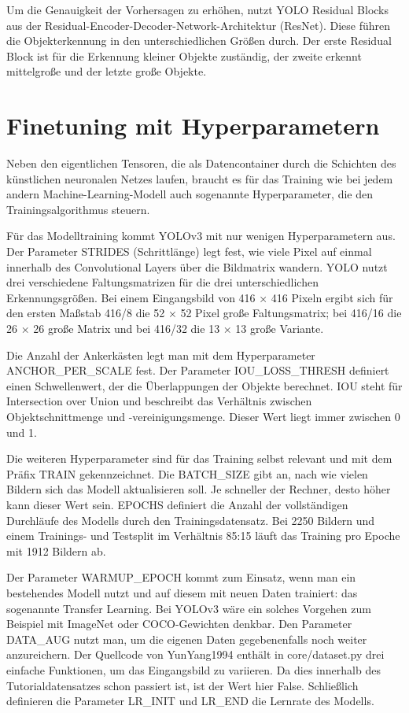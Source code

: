 	Um die Genauigkeit der Vorhersagen zu erhöhen, nutzt YOLO Residual Blocks aus der Residual-Encoder-Decoder-Network-Architektur (ResNet). Diese führen die Objekterkennung in den unterschiedlichen Größen durch. Der erste Residual Block ist für die Erkennung kleiner Objekte zuständig, der zweite erkennt mittelgroße und der letzte große Objekte.  

\section{Finetuning mit Hyperparametern}

Neben den eigentlichen Tensoren, die als Datencontainer durch die Schichten des künstlichen neuronalen Netzes laufen, braucht es für das Training wie bei jedem andern Machine-Learning-Modell auch sogenannte Hyperparameter, die den Trainingsalgorithmus steuern. 

Für das Modelltraining kommt ­YOLOv3 mit nur wenigen Hyperparametern aus. Der Parameter STRIDES (Schrittlänge) legt fest, wie viele Pixel auf einmal innerhalb des Convolutional Layers über die Bildmatrix wandern. YOLO nutzt drei verschiedene Faltungsmatrizen für die drei unterschiedlichen Erkennungsgrößen. Bei einem Eingangsbild von 416 × ­416 Pixeln ergibt sich für den ersten Maßstab 416/8 die 52 × 52 Pixel große Faltungsmatrix; bei 416/16 die 26 × 26 große Matrix und bei 416/32 die 13 × 13 große Variante. 

Die Anzahl der Ankerkästen legt man mit dem Hyperparameter ANCHOR\_PER\_SCALE fest. Der Parameter IOU\_LOSS\_THRESH definiert einen Schwellenwert, der die Überlappungen der Ob­jekte berechnet. IOU steht für Intersection over Union und beschreibt das Verhältnis zwischen Objektschnittmenge und -vereinigungsmenge. Dieser Wert liegt immer zwischen 0 und 1. 

	Die weiteren Hyperparameter sind für das Training selbst relevant und mit dem Präfix TRAIN gekennzeichnet. Die BATCH\_SIZE gibt an, nach wie vielen Bildern sich das Modell aktualisieren soll. Je schneller der Rechner, desto höher kann dieser Wert sein. EPOCHS definiert die Anzahl der vollständigen Durchläufe des Modells durch den Trainingsdatensatz. Bei 2250 Bildern und einem Trainings- und Testsplit im Verhältnis 85:15 läuft das Training pro Epoche mit 1912 Bildern ab. 

Der Parameter WARMUP\_EPOCH kommt zum Einsatz, wenn man ein bestehendes Modell nutzt und auf diesem mit neuen Daten trainiert: das sogenannte Transfer Learning. Bei YOLOv3 wäre ein solches Vorgehen zum Beispiel mit Image­Net oder COCO-Gewichten denkbar. Den Parameter DATA\_AUG nutzt man, um die eigenen Daten gegebenenfalls noch weiter anzureichern. Der Quellcode von Yun­Yang1994 enthält in core/dataset.py drei einfache Funktionen, um das Eingangsbild zu variieren. Da dies innerhalb des Tutorialdatensatzes schon passiert ist, ist der Wert hier False. Schließlich definieren die Parameter LR\_INIT und LR\_END die Lernrate des Modells. 



